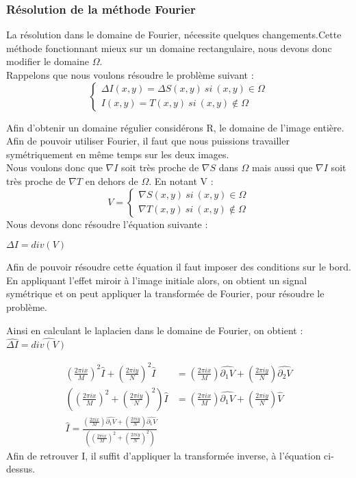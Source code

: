 \subsubsection{Résolution de la méthode Fourier}
La résolution dans le domaine de Fourier, nécessite quelques changements.Cette méthode fonctionnant mieux sur un domaine rectangulaire, nous devons donc modifier le domaine $\Omega$.\\
Rappelons que nous voulons résoudre le problème suivant :
\begin{equation}
\left\{
\begin{aligned}
\Delta I(x,y) = \Delta S(x,y) \ si \ (x,y) \in \Omega\\
I(x,y) = T(x,y) \ si \ (x,y) \notin \Omega
\end{aligned}
\right.
\end{equation}

Afin d'obtenir un domaine régulier considérons R, le domaine de l'image entière. Afin de pouvoir utiliser Fourier, il faut que nous puissions travailler symétriquement en même temps sur les deux images.\\
Nous voulons donc que $\nabla I$ soit très proche de $\nabla S$ dans $\Omega$ mais aussi que $\nabla I$ soit très proche de $\nabla T$ en dehors de $\Omega$. En notant V : 
\begin{equation}
V = 
\left\{
\begin{aligned}
\nabla S(x,y) \ si \ (x,y) \in \Omega\\
\nabla T(x,y) \ si \ (x,y) \notin \Omega
\end{aligned}
\right.
\end{equation}
Nous devons donc résoudre l'équation suivante : 
\begin{center}
$ \Delta I = div(V)$
\end{center}
Afin de pouvoir résoudre cette équation il faut imposer des conditions sur le bord. En appliquant l'effet miroir à l'image initiale alors, on obtient un signal symétrique  et on peut appliquer la transformée de Fourier, pour résoudre le problème. 

Ainsi en calculant le laplacien dans le domaine de Fourier, on obtient  : $\widehat{\Delta I} = \widehat{div(V)}$

\begin{equation}
\begin{aligned}
\left(\frac{2\pi i x}{M}\right)^2 \widehat{I}+\left(\frac{2\pi i y}{N}\right)^2 \widehat{I} & = \left(\frac{2\pi i x}{M}\right) \widehat{\partial _1 V}+\left(\frac{2\pi i y}{N}\right) \widehat{\partial _2 V}\\
\left(\left(\frac{2\pi i x}{M}\right)^2+\left(\frac{2\pi i y}{N}\right)^2\right) \widehat{I} & = \left(\frac{2\pi i x}{M}\right) \widehat{\partial _1 V}+\left(\frac{2\pi i y}{N}\right) \widehat{V}\\
\widehat{I} = \frac{\left(\frac{2\pi i x}{M}\right) \widehat{\partial _1 V}+\left(\frac{2\pi i y}{N}\right) \widehat{\partial _1 V}}{\left(\left(\frac{2\pi i x}{M}\right)^2+\left(\frac{2\pi i y}{N}\right)^2\right)}
\end{aligned}
\end{equation}
Afin de retrouver I, il suffit d'appliquer la transformée inverse, à l'équation ci-dessus.
